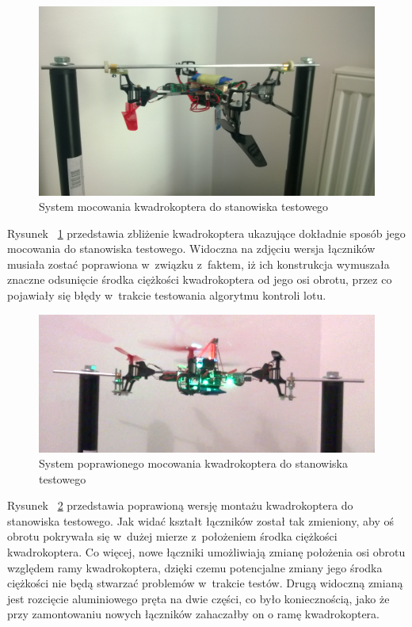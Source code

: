 \documentclass[11pt, twoside]{Thesis} %
\begin{document}
\begin{figure}[H]
	\centering
	\includegraphics[scale=0.12]{Pictures/QuadroTestStationZoom.jpg}
	\caption[System mocowania kwadrokoptera do stanowiska testowego]{System mocowania kwadrokoptera do stanowiska testowego}
	\label{fig:QuadroTestStationZoom}
\end{figure}

Rysunek ~\ref{fig:QuadroTestStationZoom} przedstawia zbliżenie kwadrokoptera ukazujące dokładnie sposób jego mocowania do stanowiska testowego. Widoczna na zdjęciu wersja łączników musiała zostać poprawiona w~związku z~faktem, iż ich konstrukcja wymuszała znaczne odsunięcie środka ciężkości kwadrokoptera od jego osi obrotu, przez co pojawiały się błędy w~trakcie testowania algorytmu kontroli lotu. 

\begin{figure}[H]
	\centering
	\includegraphics[scale=0.55]{Pictures/quadro_mont_poprawiony.png}
	\caption[System poprawionego mocowania kwadrokoptera do stanowiska testowego]{System poprawionego mocowania kwadrokoptera do stanowiska testowego}
	\label{fig:QuadroTestStationZoomPoprawiony}
\end{figure}

Rysunek ~\ref{fig:QuadroTestStationZoomPoprawiony} przedstawia poprawioną wersję montażu kwadrokoptera do stanowiska testowego. Jak widać kształt łączników został tak zmieniony, aby oś obrotu pokrywała się w~dużej mierze z~położeniem środka ciężkości kwadrokoptera. Co więcej, nowe łączniki umożliwiają zmianę położenia osi obrotu względem ramy kwadrokoptera, dzięki czemu potencjalne zmiany jego środka ciężkości nie będą stwarzać problemów w~trakcie testów. Drugą widoczną zmianą jest rozcięcie aluminiowego pręta na dwie części, co było koniecznością, jako że przy zamontowaniu nowych łączników zahaczałby on o ramę kwadrokoptera.
\end{document}
